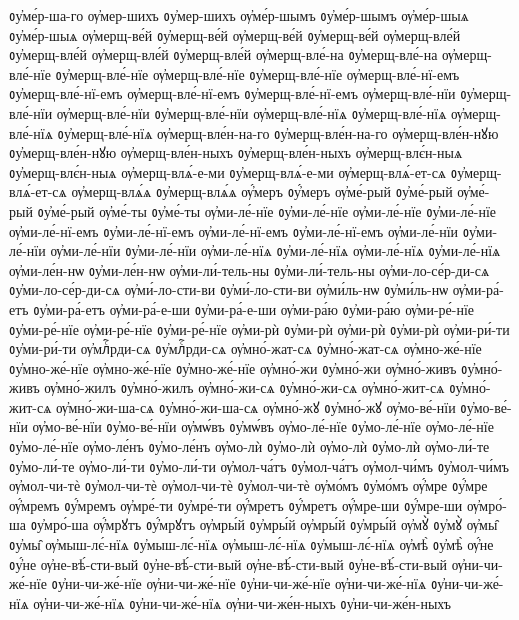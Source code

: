 {ᲂу҆ме́р-ша-го
ѹ҆мер-шихъ
ᲂу҆мер-шихъ
ѹ҆ме́р-шымъ
ᲂу҆ме́р-шымъ
ѹ҆ме́р-шыѧ
ᲂу҆ме́р-шыѧ
ѹ҆мерщ-ве́й
ᲂу҆мерщ-ве́й
ѹ҆мерщ-ве́й
ᲂу҆мерщ-ве́й
ѹ҆мерщ-вле́й
ᲂу҆мерщ-вле́й
ѹ҆мерщ-вле́й
ᲂу҆мерщ-вле́й
ѹ҆мерщ-вле́-на
ᲂу҆мерщ-вле́-на
ѹ҆мерщ-вле́-нїе
ᲂу҆мерщ-вле́-нїе
ѹ҆мерщ-вле́-нїе
ᲂу҆мерщ-вле́-нїе
ѹ҆мерщ-вле́-нї-емъ
ᲂу҆мерщ-вле́-нї-емъ
ѹ҆мерщ-вле́-нї-емъ
ᲂу҆мерщ-вле́-нї-емъ
ѹ҆мерщ-вле́-нїи
ᲂу҆мерщ-вле́-нїи
ѹ҆мерщ-вле́-нїи
ᲂу҆мерщ-вле́-нїи
ѹ҆мерщ-вле́-нїѧ
ᲂу҆мерщ-вле́-нїѧ
ѹ҆мерщ-вле́-нїѧ
ᲂу҆мерщ-вле́-нїѧ
ѹ҆мерщ-вле́н-на-го
ᲂу҆мерщ-вле́н-на-го
ѹ҆мерщ-вле́н-нꙋю
ᲂу҆мерщ-вле́н-нꙋю
ѹ҆мерщ-вле́н-ныхъ
ᲂу҆мерщ-вле́н-ныхъ
ѹ҆мерщ-влє́н-ныѧ
ᲂу҆мерщ-влє́н-ныѧ
ѹ҆мерщ-влѧ́-е-ми
ᲂу҆мерщ-влѧ́-е-ми
ѹ҆мерщ-влѧ́-ет-сѧ
ᲂу҆мерщ-влѧ́-ет-сѧ
ѹ҆мерщ-влѧ́ѧ
ᲂу҆мерщ-влѧ́ѧ
ѹ҆́меръ
ᲂу҆́меръ
ѹ҆ме́-рый
ᲂу҆ме́-рый
ѹ҆ме́-рый
ᲂу҆ме́-рый
ѹ҆ме́-ты
ᲂу҆ме́-ты
ѹ҆ми-ле́-нїе
ᲂу҆ми-ле́-нїе
ѹ҆ми-ле́-нїе
ᲂу҆ми-ле́-нїе
ѹ҆ми-ле́-нї-емъ
ᲂу҆ми-ле́-нї-емъ
ѹ҆ми-ле́-нї-емъ
ᲂу҆ми-ле́-нї-емъ
ѹ҆ми-ле́-нїи
ᲂу҆ми-ле́-нїи
ѹ҆ми-ле́-нїи
ᲂу҆ми-ле́-нїи
ѹ҆ми-ле́-нїѧ
ᲂу҆ми-ле́-нїѧ
ѹ҆ми-ле́-нїѧ
ᲂу҆ми-ле́-нїѧ
ѹ҆ми-ле́н-нѡ
ᲂу҆ми-ле́н-нѡ
ѹ҆ми-ли́-тель-ны
ᲂу҆ми-ли́-тель-ны
ѹ҆ми-ло-се́р-ди-сѧ
ᲂу҆ми-ло-се́р-ди-сѧ
ѹ҆ми́-ло-сти-ви
ᲂу҆ми́-ло-сти-ви
ѹ҆ми́ль-нѡ
ᲂу҆ми́ль-нѡ
ѹ҆ми-ра́-етъ
ᲂу҆ми-ра́-етъ
ѹ҆ми-ра́-е-ши
ᲂу҆ми-ра́-е-ши
ѹ҆ми-ра́ю
ᲂу҆ми-ра́ю
ѹ҆ми-ре́-нїе
ᲂу҆ми-ре́-нїе
ѹ҆ми-ре́-нїе
ᲂу҆ми-ре́-нїе
ѹ҆ми-рѝ
ᲂу҆ми-рѝ
ѹ҆ми-рѝ
ᲂу҆ми-рѝ
ѹ҆ми-ри́-ти
ᲂу҆ми-ри́-ти
ѹ҆млⷭ҇рди-сѧ
ᲂу҆млⷭ҇рди-сѧ
ѹ҆мно́-жат-сѧ
ᲂу҆мно́-жат-сѧ
ѹ҆мно-же́-нїе
ᲂу҆мно-же́-нїе
ѹ҆мно-же́-нїе
ᲂу҆мно-же́-нїе
ѹ҆мно́-жи
ᲂу҆мно́-жи
ѹ҆мно́-живъ
ᲂу҆мно́-живъ
ѹ҆мно́-жилъ
ᲂу҆мно́-жилъ
ѹ҆мно́-жи-сѧ
ᲂу҆мно́-жи-сѧ
ѹ҆мно́-жит-сѧ
ᲂу҆мно́-жит-сѧ
ѹ҆мно́-жи-ша-сѧ
ᲂу҆мно́-жи-ша-сѧ
ѹ҆мно́-жꙋ
ᲂу҆мно́-жꙋ
ѹ҆мо-ве́-нїи
ᲂу҆мо-ве́-нїи
ѹ҆мо-ве́-нїи
ᲂу҆мо-ве́-нїи
ѹ҆мѡ́въ
ᲂу҆мѡ́въ
ѹ҆мо-ле́-нїе
ᲂу҆мо-ле́-нїе
ѹ҆мо-ле́-нїе
ᲂу҆мо-ле́-нїе
ѹ҆мо-ле́нъ
ᲂу҆мо-ле́нъ
ѹ҆мо-лѝ
ᲂу҆мо-лѝ
ѹ҆мо-лѝ
ᲂу҆мо-лѝ
ѹ҆мо-ли́-те
ᲂу҆мо-ли́-те
ѹ҆мо-ли́-ти
ᲂу҆мо-ли́-ти
ѹ҆мол-ча́тъ
ᲂу҆мол-ча́тъ
ѹ҆мол-чи́мъ
ᲂу҆мол-чи́мъ
ѹ҆мол-чи-тѐ
ᲂу҆мол-чи-тѐ
ѹ҆мол-чи-тѐ
ᲂу҆мол-чи-тѐ
ѹ҆мо́мъ
ᲂу҆мо́мъ
ѹ҆́мре
ᲂу҆́мре
ѹ҆́мремъ
ᲂу҆́мремъ
ѹ҆мре́-ти
ᲂу҆мре́-ти
ѹ҆́мретъ
ᲂу҆́мретъ
ѹ҆́мре-ши
ᲂу҆́мре-ши
ѹ҆мро́-ша
ᲂу҆мро́-ша
ѹ҆́мрꙋтъ
ᲂу҆́мрꙋтъ
ѹ҆мры́й
ᲂу҆мры́й
ѹ҆мры́й
ᲂу҆мры́й
ѹ҆мꙋ̀
ᲂу҆мꙋ̀
ѹ҆мы̑
ᲂу҆мы̑
ѹ҆мыш-лє́-нїѧ
ᲂу҆мыш-лє́-нїѧ
ѹ҆мыш-лє́-нїѧ
ᲂу҆мыш-лє́-нїѧ
ѹ҆мѣ̀
ᲂу҆мѣ̀
ѹ҆́не
ᲂу҆́не
ѹ҆не-вѣ́-сти-вый
ᲂу҆не-вѣ́-сти-вый
ѹ҆не-вѣ́-сти-вый
ᲂу҆не-вѣ́-сти-вый
ѹ҆ни-чи-же́-нїе
ᲂу҆ни-чи-же́-нїе
ѹ҆ни-чи-же́-нїе
ᲂу҆ни-чи-же́-нїе
ѹ҆ни-чи-же́-нїѧ
ᲂу҆ни-чи-же́-нїѧ
ѹ҆ни-чи-же́-нїѧ
ᲂу҆ни-чи-же́-нїѧ
ѹ҆ни-чи-же́н-ныхъ
ᲂу҆ни-чи-же́н-ныхъ
}
